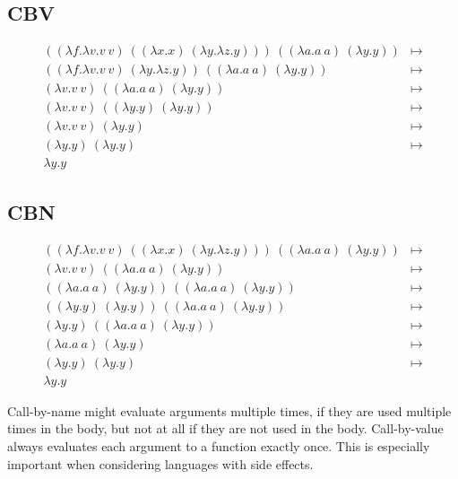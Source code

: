 \documentclass{article}
\begin{document}
\subsection*{CBV}
\begin{align*}
  ((\lambda f.\lambda v.v\ v)\ ((\lambda x.x)\ (\lambda y.\lambda z.y)))\ ((\lambda a.a\ a)\ (\lambda y.y)) & \mapsto \\ 
  ((\lambda f.\lambda v.v\ v)\ (\lambda y.\lambda z.y))\ ((\lambda a.a\ a)\ (\lambda y.y)) & \mapsto\\
  (\lambda v.v\ v)\ ((\lambda a.a\ a)\ (\lambda y.y)) & \mapsto \\ 
  (\lambda v.v\ v)\ ((\lambda y.y)\ (\lambda y.y)) & \mapsto \\
  (\lambda v.v\ v)\ (\lambda y.y) & \mapsto\\
  (\lambda y.y)\ (\lambda y.y) & \mapsto \\
  \lambda y.y
\end{align*}

\subsection*{CBN}
\begin{align*}
  ((\lambda f.\lambda v.v\ v)\ ((\lambda x.x)\ (\lambda y.\lambda z.y)))\ ((\lambda a.a\ a)\ (\lambda y.y)) & \mapsto \\ 
  (\lambda v.v\ v)\ ((\lambda a.a\ a)\ (\lambda y.y)) & \mapsto \\
  ((\lambda a.a\ a)\ (\lambda y.y))\ ((\lambda a.a\ a)\ (\lambda y.y)) & \mapsto \\ 
  ((\lambda y.y)\ (\lambda y.y))\ ((\lambda a.a\ a)\ (\lambda y.y))& \mapsto \\
  (\lambda y.y)\ ((\lambda a.a\ a)\ (\lambda y.y)) & \mapsto \\
  (\lambda a.a\ a)\ (\lambda y.y) & \mapsto\\ 
  (\lambda y.y)\ (\lambda y.y) & \mapsto \\
  \lambda y.y
\end{align*}

Call-by-name might evaluate arguments multiple times, if they are used multiple times in the body, but not at all if they are not used in the body.
Call-by-value always evaluates each argument to a function exactly once. 
This is especially important when considering languages with side effects.
\end{document}
